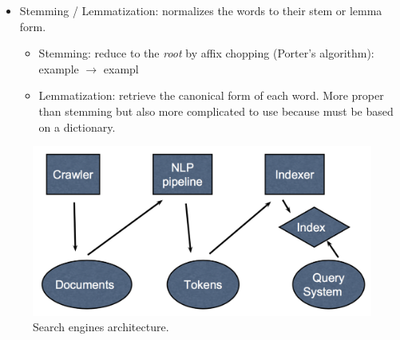\begin{itemize}
	\item Stemming / Lemmatization: normalizes the words to their stem or lemma form.
	\begin{itemize}
		\item Stemming: reduce to the {\it root} by affix chopping (Porter's algorithm): example $\rightarrow$ exampl
		\item Lemmatization: retrieve the canonical form of each word. More proper than stemming but also more complicated to use because must be based on a dictionary.
	\end{itemize}

\end{itemize}

\begin{figure}[H]%
 \centering
 \includegraphics[width=13cm]{./img/11/SE_architecture}
 \caption{\label{pic:SE_pipline} Search engines architecture.}
\end{figure}



























